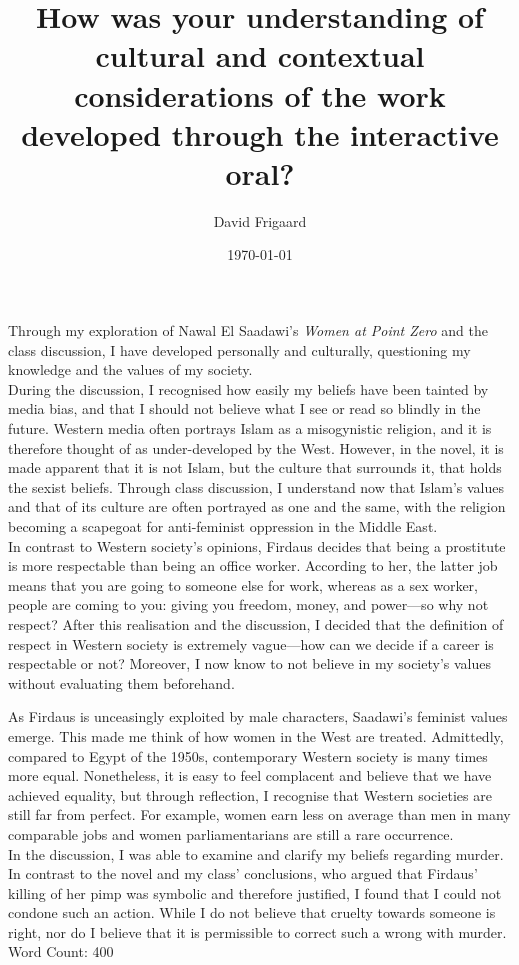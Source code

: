 \documentclass[iltitle]{../frigaardreportF}
\author{David Frigaard}
\title{How was your understanding of cultural and contextual considerations of the work developed through the interactive oral?}
\date{\today}
\begin{document}
\maketitle
Through my exploration of Nawal El Saadawi's \emph{Women at Point Zero} and the class discussion, I have developed personally and culturally, questioning my knowledge and the values of my society.\\

\noindent During the discussion, I recognised how easily my beliefs have been tainted by media bias, and that I should not believe what I see or read so blindly in the future. Western media often portrays Islam as a misogynistic religion, and it is therefore thought of as under-developed by the West. However, in the novel, it is made apparent that it is not Islam, but the culture that surrounds it, that holds the sexist beliefs. Through class discussion, I understand now that Islam's values and that of its culture are often portrayed as one and the same, with the religion becoming a scapegoat for anti-feminist oppression in the Middle East.\\

\noindent In contrast to Western society's opinions, Firdaus decides that being a prostitute is more respectable than being an office worker. According to her, the latter job means that you are going to someone else for work, whereas as a sex worker, people are coming to you: giving you freedom, money, and power---so why not respect? After this realisation and the discussion, I decided that the definition of respect in Western society is extremely vague---how can we decide if a career is respectable or not? Moreover, I now know to not believe in my society's values without evaluating them beforehand.\\ 
\clearpage

\noindent As Firdaus is unceasingly exploited by male characters, Saadawi's feminist values emerge. This made me think of how women in the West are treated. Admittedly, compared to Egypt of the 1950s, contemporary Western society is many times more equal. Nonetheless, it is easy to feel complacent and believe that we have achieved equality, but through reflection, I recognise that Western societies are still far from perfect. For example, women earn less on average than men in many comparable jobs and women parliamentarians are still a rare occurrence.\\

\noindent In the discussion, I was able to examine and clarify my beliefs regarding murder.  In contrast to the novel and my class' conclusions, who argued that Firdaus' killing of her pimp was symbolic and therefore justified, I found that I could not condone such an action.  While I do not believe that cruelty towards someone is right, nor do I believe that it is permissible to correct such a wrong with murder.\\

\flushright Word Count: 400
\end{document}
